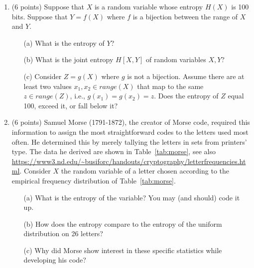 \documentclass[11pt]{article}
\theoremstyle{theorem}
\theoremstyle{lemma}
\theoremstyle{corollary}
\theoremstyle{definition}
\begin{document}
 \begin{enumerate}
     \item   (6 points) Suppose that $X$ is a random variable whose entropy $H(X)$ is 100 bits.  Suppose that $Y=f(X)$ where $f$ is a bijection between the range of $X$ and $Y$. 
 \begin{itemize}
     \item [(a)] What is the entropy of $Y$? 
     \item [(b)] What is the joint entropy $H[X,Y]$ of random variables $X,Y$? 
     \item [(c)] Consider $Z=g(X)$ where $g$ is not a bijection. Assume there are at least two values $x_1, x_2 \in range(X)$ that map to the same $z \in range(Z)$, i.e., $g(x_1)=g(x_2)=z$. Does the entropy of \(Z\) equal 100, exceed it, or fall below it?
 \end{itemize}

\item (6 points)
Samuel Morse (1791-1872), the creator of Morse code, required this information to assign the most straightforward codes to the letters used most often. He determined this by merely tallying the letters in sets from printers' type. The data he derived are shown in Table~\ref{tab:morse}, see also \url{https://www3.nd.edu/~busiforc/handouts/cryptography/letterfrequencies.html}. Consider $X$ the random variable of a letter chosen according to the empirical frequency distribution of Table~\ref{tab:morse}. 

\begin{itemize}
    \item [(a)] What is the entropy of the variable? You may (and should) code it up.  
    \item [(b)] How does the entropy compare to the entropy of the uniform distribution on 26 letters?
    \item [(c)] Why did Morse show interest in these specific statistics while developing his code?
\end{itemize}  


\end{enumerate}
\end{document}
